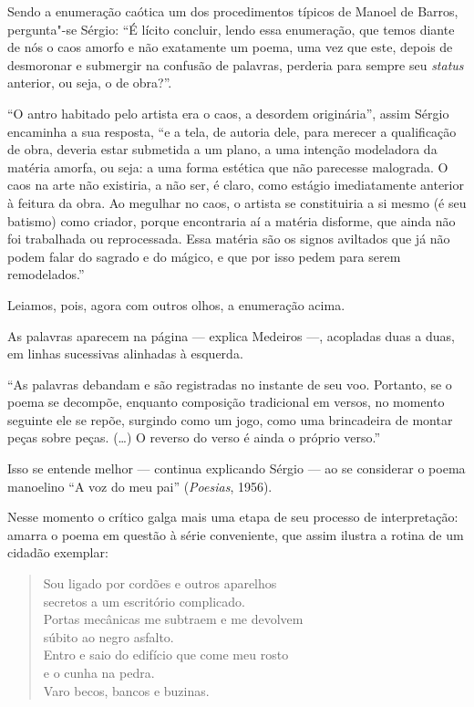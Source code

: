 Sendo a enumeração caótica um dos procedimentos típicos de Manoel de
Barros, pergunta"-se Sérgio: ``É lícito concluir, lendo essa enumeração,
que temos diante de nós o caos amorfo e não exatamente um poema, uma vez
que este, depois de desmoronar e submergir na confusão de palavras,
perderia para sempre seu \emph{status} anterior, ou seja, o de
obra?''.

``O antro habitado pelo artista era o caos, a desordem originária'',
assim Sérgio encaminha a sua resposta, ``e a tela, de autoria dele,
para merecer a qualificação de obra, deveria estar submetida a um plano,
a uma intenção modeladora da matéria amorfa, ou seja: a uma forma
estética que não parecesse malograda. O caos na arte não existiria, a
não ser, é claro, como estágio imediatamente anterior à feitura da obra.
Ao megulhar no caos, o artista se constituiria a si mesmo (é seu
batismo) como criador, porque encontraria aí a matéria disforme, que
ainda não foi trabalhada ou reprocessada. Essa matéria são os signos
aviltados que já não podem falar do sagrado e do mágico, e que por isso
pedem para serem remodelados.''

Leiamos, pois, agora com outros olhos, a enumeração acima.

As palavras aparecem na página --- explica Medeiros ---, acopladas duas a duas, em linhas sucessivas alinhadas à
esquerda.

``As palavras debandam e são registradas no instante de seu voo.
Portanto, se o poema se decompõe, enquanto composição tradicional em
versos, no momento seguinte ele se repõe, surgindo como um jogo, como
uma brincadeira de montar peças sobre peças. (\ldots{}) O reverso do verso é
ainda o próprio verso.''

Isso se entende melhor --- continua explicando Sérgio --- ao se considerar
o poema manoelino ``A voz do meu pai'' (\emph{Poesias}, 1956).

Nesse momento o crítico galga mais uma etapa de seu processo de
interpretação: amarra o poema em questão à série conveniente, que assim
ilustra a rotina de um cidadão exemplar:

\begin{verse}
Sou ligado por cordões e outros aparelhos\\
secretos a um escritório complicado. \\
Portas mecânicas me subtraem e me devolvem\\
súbito ao negro asfalto. \\
Entro e saio do edifício que come meu rosto\\
e o cunha na pedra. \\
Varo becos, bancos e buzinas.
\end{verse}

